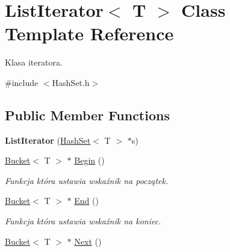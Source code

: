 \hypertarget{class_list_iterator}{}\section{List\+Iterator$<$ T $>$ Class Template Reference}
\label{class_list_iterator}


Klasa iteratora.  




{\ttfamily \#include $<$Hash\+Set.\+h$>$}

\subsection*{Public Member Functions}
\begin{DoxyCompactItemize}
\item 
{\bfseries List\+Iterator} (\hyperlink{class_hash_set}{Hash\+Set}$<$ T $>$ $\ast$s)\hypertarget{class_list_iterator_aafed9c207e4bde929152ff16d037aaf9}{}\label{class_list_iterator_aafed9c207e4bde929152ff16d037aaf9}

\item 
\hyperlink{struct_bucket}{Bucket}$<$ T $>$ $\ast$ \hyperlink{class_list_iterator_a09d31f9af3483633ea6c7f08496f5af6}{Begin} ()\hypertarget{class_list_iterator_a09d31f9af3483633ea6c7f08496f5af6}{}\label{class_list_iterator_a09d31f9af3483633ea6c7f08496f5af6}

\begin{DoxyCompactList}\small\item\em Funkcja która ustawia wskaźnik na początek. \end{DoxyCompactList}\item 
\hyperlink{struct_bucket}{Bucket}$<$ T $>$ $\ast$ \hyperlink{class_list_iterator_a68036657aeb10fb43edf0a5b0b4f8df0}{End} ()\hypertarget{class_list_iterator_a68036657aeb10fb43edf0a5b0b4f8df0}{}\label{class_list_iterator_a68036657aeb10fb43edf0a5b0b4f8df0}

\begin{DoxyCompactList}\small\item\em Funkcja która ustawia wskaźnik na koniec. \end{DoxyCompactList}\item 
\hyperlink{struct_bucket}{Bucket}$<$ T $>$ $\ast$ \hyperlink{class_list_iterator_aa3ff3abaa72837abfbcd7af801ebe213}{Next} ()\hypertarget{class_list_iterator_aa3ff3abaa72837abfbcd7af801ebe213}{}\label{class_list_iterator_aa3ff3abaa72837abfbcd7af801ebe213}


\end{DoxyCompactItemize}
